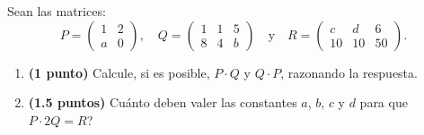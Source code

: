 
Sean las matrices:
\[
P=\begin{pmatrix}1&2\\a&0\end{pmatrix},\quad Q=\begin{pmatrix}1&1&5\\8&4&b\end{pmatrix}\quad\text{y}\quad R=\begin{pmatrix}c&d&6\\10&10&50\end{pmatrix}.
\]
\begin{enumerate}[label=\alph*)]
\item \textbf{(1 punto)} Calcule, si es posible, $P\cdot Q$ y $Q\cdot P$, razonando la respuesta.
\item \textbf{(1.5 puntos)} \textquestiondown{}Cuánto deben valer las constantes $a$, $b$, $c$ y $d$ para que $P\cdot2Q=R$?
\end{enumerate}
